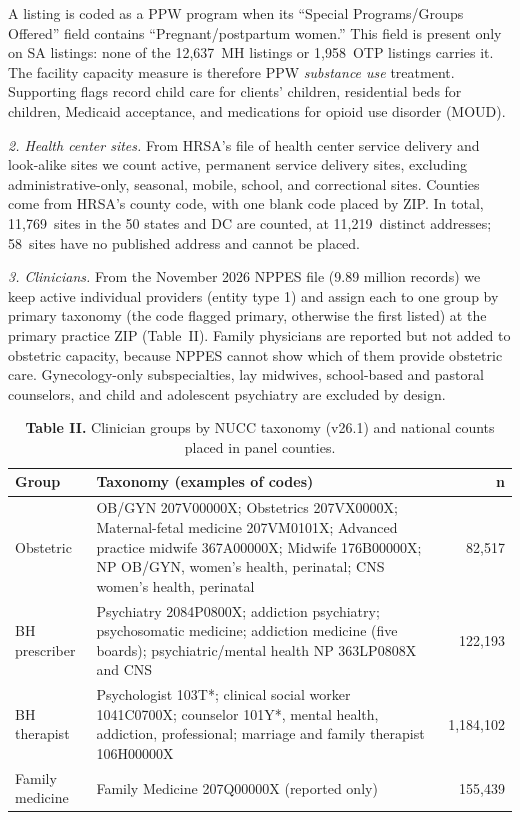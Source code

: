 \documentclass{article}
\begin{document}
A listing is coded as a PPW program when its ``Special Programs/Groups Offered'' field contains ``Pregnant/postpartum women.'' This field is present only on SA listings: none of the 12,637\ MH listings or 1,958\ OTP listings carries it. The facility capacity measure is therefore PPW \emph{substance use} treatment. Supporting flags record child care for clients' children, residential beds for children, Medicaid acceptance, and medications for opioid use disorder (MOUD).

\textit{2. Health center sites.} 
From HRSA's file of health center service delivery and look-alike sites we count active, permanent service delivery sites, excluding administrative-only, seasonal, mobile, school, and correctional sites. Counties come from HRSA's county code, with one blank code placed by ZIP. In total, 11,769\ sites in the 50 states and DC are counted, at 11,219\ distinct addresses; 58\ sites have no published address and cannot be placed.

\textit{3. Clinicians.} 
From the November 2026 NPPES file (9.89 million records) we keep active individual providers (entity type 1) and assign each to one group by primary taxonomy (the code flagged primary, otherwise the first listed) at the primary practice ZIP (Table~II). Family physicians are reported but not added to obstetric capacity, because NPPES cannot show which of them provide obstetric care. Gynecology-only subspecialties, lay midwives, school-based and pastoral counselors, and child and adolescent psychiatry are excluded by design.

\begin{table}
\centering
\caption{\textbf{Table II.} Clinician groups by NUCC taxonomy (v26.1) and national counts placed in panel counties.}

\begin{tabular}{@{}p{1.6cm}p{4.6cm}r@{}}
\toprule
Group & Taxonomy (examples of codes) & n \\
\midrule
Obstetric & OB/GYN 207V00000X; Obstetrics 207VX0000X; Maternal-fetal medicine 207VM0101X; Advanced practice midwife 367A00000X; Midwife 176B00000X; NP OB/GYN, women's health, perinatal; CNS women's health, perinatal & 82,517 \\
BH prescriber & Psychiatry 2084P0800X; addiction psychiatry; psychosomatic medicine; addiction medicine (five boards); psychiatric/mental health NP 363LP0808X and CNS & 122,193 \\
BH therapist & Psychologist 103T*; clinical social worker 1041C0700X; counselor 101Y*, mental health, addiction, professional; marriage and family therapist 106H00000X & 1,184,102 \\
Family medicine & Family Medicine 207Q00000X (reported only) & 155,439 \\
\bottomrule
\end{tabular}
\end{table}
\end{document}
